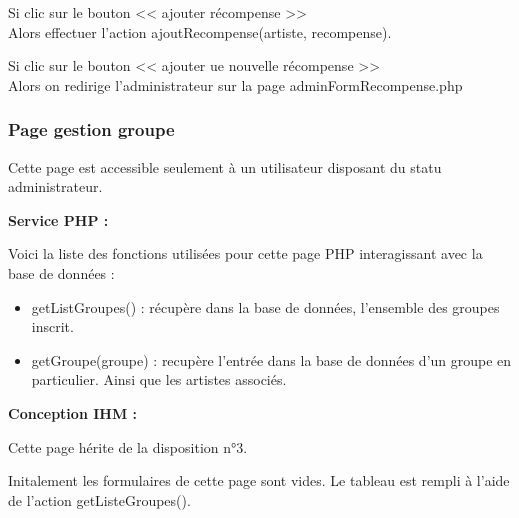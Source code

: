 			\begin{paragraphe}
				Si clic sur le bouton << ajouter récompense >> \\
				Alors effectuer l'action ajoutRecompense(artiste, recompense).
			\end{paragraphe}

			\begin{paragraphe}
				Si clic sur le bouton << ajouter ue nouvelle récompense >> \\
				Alors on redirige l'administrateur sur la page adminFormRecompense.php
			\end{paragraphe}

			\begin{paragraphe}
			\end{paragraphe}

		\subsubsection{Page gestion groupe}

			\begin{paragraphe}
				Cette page est accessible seulement à un utilisateur disposant du statu administrateur.
			\end{paragraphe}

			\begin{paragraphe}
				\textbf{Service PHP :}
			\end{paragraphe}

			\begin{paragraphe}
				Voici la liste des fonctions utilisées pour cette page PHP interagissant avec la base de données :
			\end{paragraphe}

			\begin{paragraphe}
				\begin{itemize}
					\item getListGroupes() : récupère dans la base de données, l'ensemble des groupes inscrit.
					\item getGroupe(groupe) : recupère l'entrée dans la base de données d'un groupe en particulier. Ainsi que les artistes associés.
				\end{itemize}
			\end{paragraphe}

			\begin{paragraphe}
				\textbf{Conception IHM :}
			\end{paragraphe}

			\begin{paragraphe}
				Cette page hérite de la disposition n°3.\par
				Initalement les formulaires de cette page sont vides.
				Le tableau est rempli à l'aide de l'action getListeGroupes().
			\end{paragraphe}

